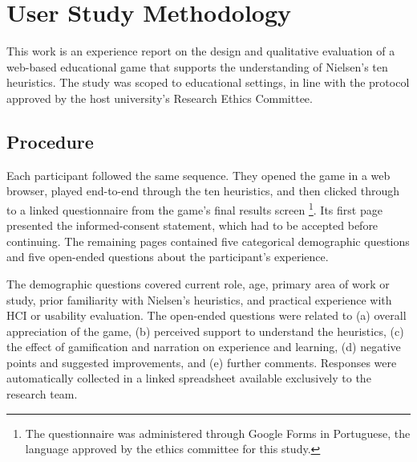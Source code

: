 \section{User Study Methodology}
\label{sec:method}


This work is an experience report on the design and qualitative evaluation of a web-based educational game that supports the understanding of Nielsen's ten heuristics. The study was scoped to educational settings, in line with the protocol approved by the host university's Research Ethics Committee.


\subsection{Procedure}

Each participant followed the same sequence. They opened the game in a web browser, played end-to-end through the ten heuristics, and then clicked through to a linked questionnaire from the game's final results screen \footnote{The questionnaire was administered through Google Forms in Portuguese, the language approved by the ethics committee for this study.}. Its first page presented the informed-consent statement, which had to be accepted before continuing. The remaining pages contained five categorical demographic questions and five open-ended questions about the participant's experience.

The demographic questions covered current role, age, primary area of work or study, prior familiarity with Nielsen's heuristics, and practical experience with HCI or usability evaluation. The open-ended questions were related to (a) overall appreciation of the game, (b) perceived support to understand the heuristics, (c) the effect of gamification and narration on experience and learning, (d) negative points and suggested improvements, and (e) further comments. Responses were automatically collected in a linked spreadsheet available exclusively to the research team.

